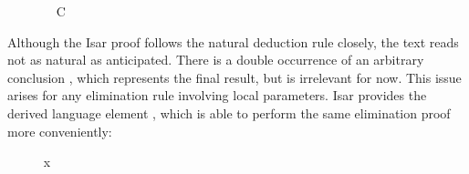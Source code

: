 \begin{isabellebody}
\begin{minipage}{0.6\textwidth}
\ \ \ \ \ \ \isamarkupfalse%
\ C%
\endisatagproof
{\isafoldproof}%
%
\isadelimproof
%
\endisadelimproof
%
\isadelimnoproof
\ %
\endisadelimnoproof
%
\isatagnoproof
{}\isamarkupfalse%
%
\endisatagnoproof
{\isafoldnoproof}%
%
\isadelimnoproof
%
\endisadelimnoproof
\isanewline
%
\isadelimproof
\ \ \ \ %
\endisadelimproof
%
\isatagproof
{}\isamarkupfalse%
%
\endisatagproof
{\isafoldproof}%
%
\isadelimproof
%
\endisadelimproof
%
\end{minipage}\begin{minipage}{0.4\textwidth}
%
\begin{isamarkuptext}%
%
\end{isamarkuptext}%
\isamarkuptrue%
%
\end{minipage}
%
\begin{isamarkuptext}%
\medskip\noindent Although the Isar proof follows the natural
  deduction rule closely, the text reads not as natural as
  anticipated.  There is a double occurrence of an arbitrary
  conclusion , which represents the final result, but is
  irrelevant for now.  This issue arises for any elimination rule
  involving local parameters.  Isar provides the derived language
  element \hyperlink{command.obtain}{\mbox{}}, which is able to perform the same
  elimination proof more conveniently:%
\end{isamarkuptext}%
\isamarkuptrue%
%
\isadelimproof
\ \ \ \ %
\endisadelimproof
%
\isatagproof
{}\isamarkupfalse%
\ {}x\ {}\ {}{}{}\isanewline

\end{isabellebody}
